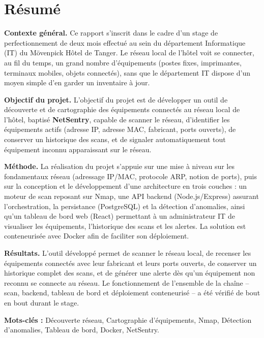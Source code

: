 \chapter*{Résumé}

\noindent\textbf{Contexte général.} Ce rapport s'inscrit dans le cadre d'un stage de
perfectionnement de deux mois effectué au sein du département Informatique (IT) du
Mövenpick Hôtel de Tanger. Le réseau local de l'hôtel voit se connecter, au fil du
temps, un grand nombre d'équipements (postes fixes, imprimantes, terminaux mobiles,
objets connectés), sans que le département IT dispose d'un moyen simple d'en garder un
inventaire à jour.

\vspace{0.3cm}
\noindent\textbf{Objectif du projet.} L'objectif du projet est de développer un outil de
découverte et de cartographie des équipements connectés au réseau local de l'hôtel,
baptisé \textbf{NetSentry}, capable de scanner le réseau, d'identifier les équipements
actifs (adresse IP, adresse MAC, fabricant, ports ouverts), de conserver un historique
des scans, et de signaler automatiquement tout équipement inconnu apparaissant sur le
réseau.

\vspace{0.3cm}
\noindent\textbf{Méthode.} La réalisation du projet s'appuie sur une mise à niveau sur
les fondamentaux réseau (adressage IP/MAC, protocole ARP, notion de ports), puis sur la
conception et le développement d'une architecture en trois couches : un moteur de scan
reposant sur Nmap, une API backend (Node.js/Express) assurant l'orchestration, la
persistance (PostgreSQL) et la détection d'anomalies, ainsi qu'un tableau de bord web
(React) permettant à un administrateur IT de visualiser les équipements, l'historique
des scans et les alertes. La solution est conteneurisée avec Docker afin de faciliter
son déploiement.

\vspace{0.3cm}
\noindent\textbf{Résultats.} L'outil développé permet de scanner le réseau local, de
recenser les équipements connectés avec leur fabricant et leurs ports ouverts, de
conserver un historique complet des scans, et de générer une alerte dès qu'un équipement
non reconnu se connecte au réseau. Le fonctionnement de l'ensemble de la chaîne --
scan, backend, tableau de bord et déploiement conteneurisé -- a été vérifié de bout en
bout durant le stage.

\vspace{0.5cm}
\noindent \textbf{Mots-clés :} Découverte réseau, Cartographie d'équipements, Nmap,
Détection d'anomalies, Tableau de bord, Docker, NetSentry.
